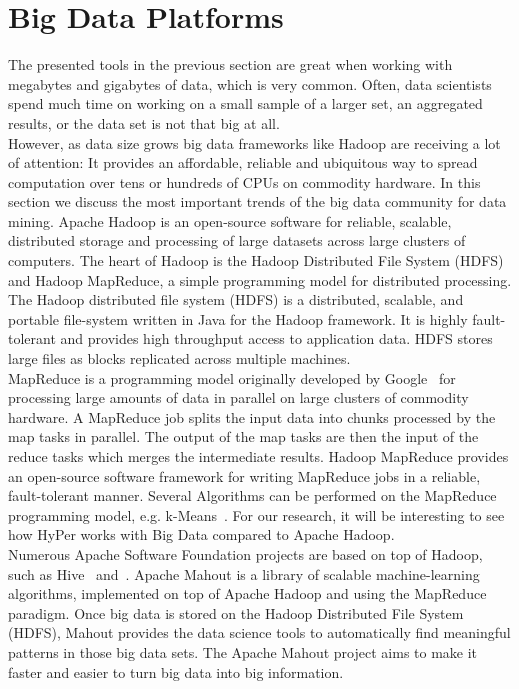 \section{Big Data Platforms}
The presented tools in the previous section are great when working with megabytes and gigabytes of data, which is very common. Often, data scientists spend much time on working on a small sample of a larger set, an aggregated results, or the data set is not that big at all.
\\
However, as data size grows big data frameworks like Hadoop are receiving a lot of attention: It provides an affordable, reliable and ubiquitous way to spread computation over tens or hundreds of CPUs on commodity hardware. In this section we discuss the most important trends of the big data community for data mining. Apache Hadoop is an open-source software for reliable, scalable, distributed storage and processing of large datasets across large clusters of computers. The heart of Hadoop is the Hadoop Distributed File System (HDFS) and Hadoop MapReduce, a simple programming model for distributed processing. 
\\
The Hadoop distributed file system (HDFS) is a distributed, scalable, and portable file-system written in Java for the Hadoop framework. It is highly fault-tolerant and provides high throughput access to application data. HDFS stores large files as blocks replicated across multiple machines.
\\
MapReduce is a programming model originally developed by Google~\parencite{mapreduce} for processing large amounts of data in parallel on large clusters of commodity hardware. A MapReduce job splits the input data into chunks processed by the map tasks in parallel. The output of the map tasks are then the input of the reduce tasks which merges the intermediate results. Hadoop MapReduce provides an open-source software framework for writing MapReduce jobs in a reliable, fault-tolerant manner. 
Several Algorithms can be performed on the MapReduce programming model, e.g. k-Means~\parencite{parallelkmeans}. For our research, it will be interesting to see how HyPer works with Big Data compared to Apache Hadoop.
\\
Numerous Apache Software Foundation projects are based on top of Hadoop, such as Hive~\parencite{hive} and~\parencite{cassandra}. Apache Mahout is a library of scalable machine-learning algorithms, implemented on top of Apache Hadoop and using the MapReduce paradigm. 
Once big data is stored on the Hadoop Distributed File System (HDFS), Mahout provides the data science tools to automatically find meaningful patterns in those big data sets. The Apache Mahout project aims to make it faster and easier to turn big data into big information.
